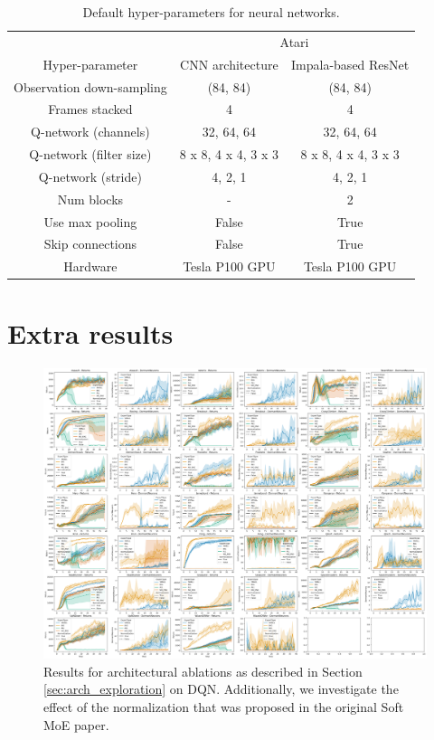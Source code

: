 {\begin{table}[!h]
 \centering
  \caption{Default hyper-parameters for neural networks.}
  \label{tbl:defaultvalues_networ}
 \begin{tabular}{@{} ccc @{}}
    \toprule
    & \multicolumn{2}{c}{Atari}\\
    \cmidrule(lr){2-3}
  Hyper-parameter &  CNN architecture \citep{mnih2015humanlevel} & Impala-based ResNet \citep{espeholt2018impala}\\
    \midrule
    Observation down-sampling & (84, 84) & (84, 84) \\
    Frames stacked &4  &4 \\
     Q-network (channels) & 32, 64, 64 & 32, 64, 64\\
     Q-network (filter size) & 8 x 8, 4 x 4, 3 x 3 & 8 x 8, 4 x 4, 3 x 3\\
     Q-network (stride)  & 4, 2, 1 & 4, 2, 1 \\
     Num blocks & - & 2 \\
     Use max pooling & False & True \\
     Skip connections & False & True \\
     Hardware & Tesla P100 GPU & Tesla P100 GPU\\
     \bottomrule
  \end{tabular}
\end{table}
}

\newpage
\section{Extra results}

\begin{figure}[!h]
    \centering
    \includegraphics[width=\textwidth]{figures/dqn_bigmoe_20_games_67.png}
    \caption{Results for architectural ablations as described in Section \ref{sec:arch_exploration} on DQN. Additionally, we investigate the effect of the normalization that was proposed in the original Soft MoE paper.}
    \label{fig:dqn_bigmoe_20_games}
\end{figure}

